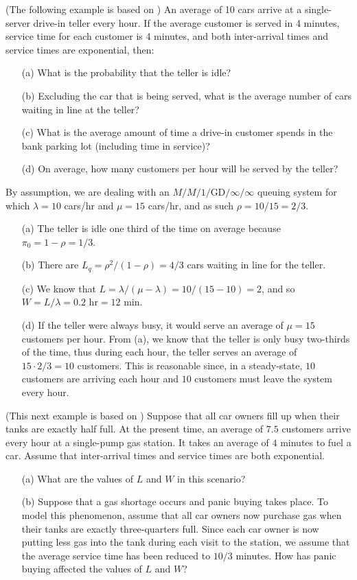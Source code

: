 (The following example is based on \cite{QS_W}) An average of 10 cars arrive at a single-server drive-in teller every hour. If the average customer is served in 4 minutes, service time for each customer is 4 minutes, and both inter-arrival times and service times are exponential, then: \begin{itemize}[noitemsep]
	\item[(a)] What is the probability that the teller is idle? 
	\item[(b)] Excluding the car that is being served, what is the average number of cars waiting in line at the teller? 
	\item[(c)] What is the average amount of time a drive-in customer spends in the bank parking lot (including time in service)?
	\item[(d)] On average, how many customers per hour will be served by the teller?
\end{itemize}
By assumption, we are dealing with an $M/M/1/\textrm{GD}/\infty/\infty$ queuing system for which $\lambda = 10$ cars/hr and $\mu = 15$ cars/hr, and as such  $\rho = 10/15 = 2/3$.
\begin{itemize}[noitemsep]
	\item[(a)] The teller is idle one third of the time on average because $\pi_{0} = 1 - \rho = 1/3$.
	\item[(b)] There are $L_{q} = \rho^{2}/(1-\rho) = 4/3$ cars waiting in line for the teller. 
	\item[(c)] We know that $L = \lambda/(\mu - \lambda) = 10/(15-10) = 2$, and so $W = L/\lambda = 0.2 \textrm{ hr} = 12 \textrm{ min}$.
	\item[(d)] If the teller were always busy, it would serve an average of $\mu = 15$ customers per hour. From (a), we know that the teller is only busy two-thirds of the time, thus during each hour, the teller serves an average of $15 \cdot 2/3 = 10$ customers. This is reasonable since, in a steady-state, $10$ customers are arriving each hour and $10$ customers must leave the system every hour.
\end{itemize}
\newpage\noindent
(This next example is based on \cite{QS_E}) Suppose that all car owners fill up when their tanks are exactly half full.  At the present time, an average of $7.5$ customers arrive every hour at a single-pump gas station. It takes an average of $4$ minutes to fuel a car. Assume that inter-arrival times and service times are both exponential. \begin{itemize}[noitemsep]
	\item[(a)] What are the values of $L$ and $W$ in this scenario? 
	\item[(b)] Suppose that a gas shortage occurs and panic buying takes place. To model this phenomenon, assume that all car owners now purchase gas when their tanks are exactly three-quarters full. Since each car owner is now putting less gas into the tank during each visit to the station, we assume that the average service time has been reduced to $10/3$ minutes. How has panic buying affected the values of $L$ and $W$?
\end{itemize}
